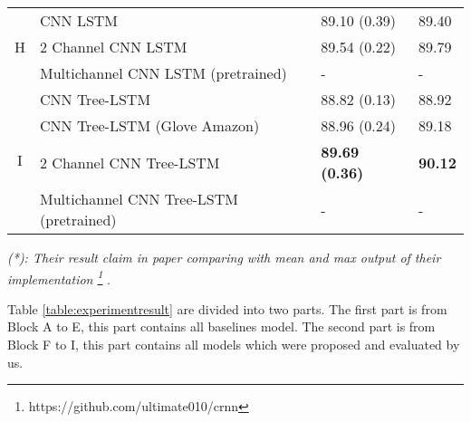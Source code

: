 \begin{table}[H]
\begin{tabular}{c|lll}
\hline
\hline
        \multirow{3}{*}{H} & CNN LSTM                                 & 89.10 (0.39)  & 89.40 \Tstrut  \\
        & 2 Channel CNN LSTM                        & 89.54    (0.22) & 89.79    \\
        & Multichannel CNN LSTM (pretrained) & - & - \\
\hline 
        \multirow{4}{*}{I} & CNN Tree-LSTM                            & 88.82 (0.13) & 88.92 \\
        & CNN Tree-LSTM (Glove Amazon)             & 88.96 (0.24) & 89.18 \\
        & 2 Channel CNN Tree-LSTM  &\textbf{89.69 (0.36)} & \textbf{90.12}    \\
        & Multichannel CNN Tree-LSTM (pretrained)        & - & -        \\
    \end{tabular}
\end{table}

\textit{(*): Their result claim in paper comparing with mean and max output of their implementation
\footnote{https://github.com/ultimate010/crnn}} .


Table \ref{table:experimentresult} are divided into two parts. 
The first part is from Block A to E, this part contains all baselines model.
The second part is from Block F to I, this part contains all models which were proposed and evaluated by us.

